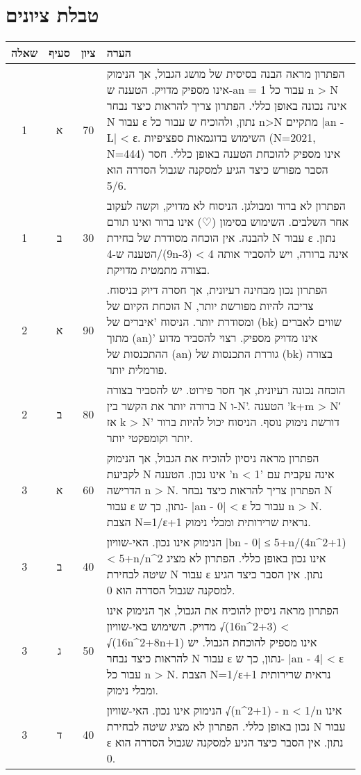 \documentclass{article}
\begin{document}
\section*{טבלת ציונים}
\begin{RTL}
\begin{tabular}{|c|c|c|p{10cm}|}
\hline
שאלה & סעיף & ציון & הערה \\
\hline
1 & א & 70 & הפתרון מראה הבנה בסיסית של מושג הגבול, אך הנימוק אינו מספיק מדויק.  הטענה ש-an = 1 עבור כל n > N אינה נכונה באופן כללי.  הפתרון צריך להראות כיצד נבחר N עבור ε נתון, ולהוכיח ש עבור כל n>N מתקיים |an - L| < ε.  השימוש בדוגמאות ספציפיות (N=2021, N=444) אינו מספיק להוכחת הטענה באופן כללי.  חסר הסבר מפורש כיצד הגיע למסקנה שגבול הסדרה הוא 5/6. \\ \hline
1 & ב & 30 & הפתרון לא ברור ומבולגן.  הניסוח לא מדויק, וקשה לעקוב אחר השלבים.  השימוש בסימון (♡) אינו ברור ואינו תורם להבנה.  אין הוכחה מסודרת של בחירת N  עבור ε נתון.  הטענה ש-4/(9n-3) < 4 אינה ברורה, ויש להסביר אותה בצורה מתמטית מדויקת. \\ \hline
2 & א & 90 & הפתרון נכון מבחינה רעיונית, אך חסרה דיוק בניסוח.  הוכחת הקיום של N  צריכה להיות מפורשת יותר, ומסודרת יותר.  הניסוח 'איברים של (bk) שווים לאברים מתוך (an)' אינו מדויק מספיק.  רצוי להסביר מדוע  ההתכנסות של (an) גוררת התכנסות של (bk) בצורה פורמלית יותר. \\ \hline
2 & ב & 80 & הוכחה נכונה רעיונית, אך חסר פירוט.  יש להסביר בצורה ברורה יותר את הקשר בין N ו-N'.  הטענה 'k+m > N′ אז k > N'  דורשת נימוק נוסף.  הניסוח יכול להיות ברור יותר וקומפקטי יותר. \\ \hline
3 & א & 60 & הפתרון מראה ניסיון להוכיח את הגבול, אך הנימוק לקביעת N אינו נכון.  הטענה  'n < 1' אינה עקבית עם הדרישה n > N.  הפתרון צריך להראות כיצד נבחר N עבור ε נתון, כך ש- |an - 0| < ε עבור כל n > N.  הצבת N=1/ε+1 נראית שרירותית  ומבלי נימוק. \\ \hline
3 & ב & 40 & הנימוק אינו נכון.  האי-שוויון |bn - 0| ≤ 5+n/(4n\^{}2+1) < 5+n/n\^{}2 אינו נכון באופן כללי.  הפתרון לא מציג  שיטה לבחירת N  עבור ε נתון.  אין הסבר כיצד הגיע למסקנה שגבול הסדרה הוא 0. \\ \hline
3 & ג & 50 & הפתרון מראה ניסיון להוכיח את הגבול, אך הנימוק אינו מדויק.  השימוש באי-שוויון  √(16n\^{}2+3) < √(16n\^{}2+8n+1) אינו מספיק להוכחת הגבול.  יש להראות כיצד נבחר N עבור ε נתון, כך ש- |an - 4| < ε עבור כל n > N.  הצבת N=1/ε+1 נראית שרירותית  ומבלי נימוק. \\ \hline
3 & ד & 40 & הנימוק אינו נכון.  האי-שוויון √(n\^{}2+1) - n < 1/n אינו נכון באופן כללי.  הפתרון לא מציג  שיטה לבחירת N  עבור ε נתון. אין הסבר כיצד הגיע למסקנה שגבול הסדרה הוא 0. \\ \hline

\end{tabular}
\end{RTL}
\end{document}
